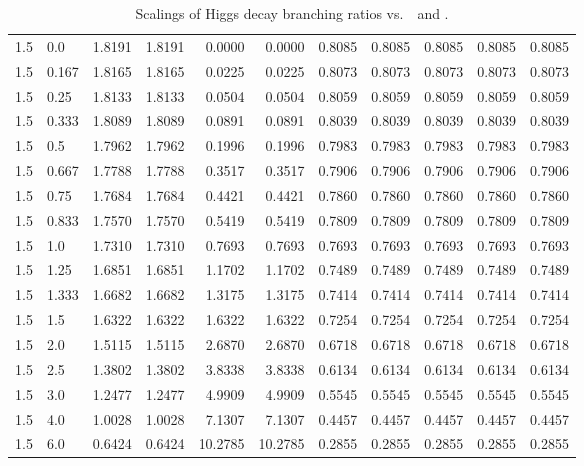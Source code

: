 \begin{table}[h!]
\begin{tabular}{ll rrrrrrrrr}
   1.5  & 0.0    & 1.8191 & 1.8191 & 0.0000  & 0.0000  & 0.8085 & 0.8085 & 0.8085 & 0.8085 & 0.8085 \\
   1.5  & 0.167  & 1.8165 & 1.8165 & 0.0225  & 0.0225  & 0.8073 & 0.8073 & 0.8073 & 0.8073 & 0.8073 \\
   1.5  & 0.25   & 1.8133 & 1.8133 & 0.0504  & 0.0504  & 0.8059 & 0.8059 & 0.8059 & 0.8059 & 0.8059 \\
   1.5  & 0.333  & 1.8089 & 1.8089 & 0.0891  & 0.0891  & 0.8039 & 0.8039 & 0.8039 & 0.8039 & 0.8039 \\
   1.5  & 0.5    & 1.7962 & 1.7962 & 0.1996  & 0.1996  & 0.7983 & 0.7983 & 0.7983 & 0.7983 & 0.7983 \\
   1.5  & 0.667  & 1.7788 & 1.7788 & 0.3517  & 0.3517  & 0.7906 & 0.7906 & 0.7906 & 0.7906 & 0.7906 \\
   1.5  & 0.75   & 1.7684 & 1.7684 & 0.4421  & 0.4421  & 0.7860 & 0.7860 & 0.7860 & 0.7860 & 0.7860 \\
   1.5  & 0.833  & 1.7570 & 1.7570 & 0.5419  & 0.5419  & 0.7809 & 0.7809 & 0.7809 & 0.7809 & 0.7809 \\
   1.5  & 1.0    & 1.7310 & 1.7310 & 0.7693  & 0.7693  & 0.7693 & 0.7693 & 0.7693 & 0.7693 & 0.7693 \\
   1.5  & 1.25   & 1.6851 & 1.6851 & 1.1702  & 1.1702  & 0.7489 & 0.7489 & 0.7489 & 0.7489 & 0.7489 \\
   1.5  & 1.333  & 1.6682 & 1.6682 & 1.3175  & 1.3175  & 0.7414 & 0.7414 & 0.7414 & 0.7414 & 0.7414 \\
   1.5  & 1.5    & 1.6322 & 1.6322 & 1.6322  & 1.6322  & 0.7254 & 0.7254 & 0.7254 & 0.7254 & 0.7254 \\
   1.5  & 2.0    & 1.5115 & 1.5115 & 2.6870  & 2.6870  & 0.6718 & 0.6718 & 0.6718 & 0.6718 & 0.6718 \\
   1.5  & 2.5    & 1.3802 & 1.3802 & 3.8338  & 3.8338  & 0.6134 & 0.6134 & 0.6134 & 0.6134 & 0.6134 \\
   1.5  & 3.0    & 1.2477 & 1.2477 & 4.9909  & 4.9909  & 0.5545 & 0.5545 & 0.5545 & 0.5545 & 0.5545 \\
   1.5  & 4.0    & 1.0028 & 1.0028 & 7.1307  & 7.1307  & 0.4457 & 0.4457 & 0.4457 & 0.4457 & 0.4457 \\
   1.5  & 6.0    & 0.6424 & 0.6424 & 10.2785 & 10.2785 & 0.2855 & 0.2855 & 0.2855 & 0.2855 & 0.2855 \\\hline
    \end{tabular}
    \caption[Scalings of Higgs decay branching ratios vs.\ \Ct\ and ]{Scalings of Higgs decay branching ratios vs.\ \Ct\ and .}\label{tab:brscalingK6_1p5}
 \end{table}
